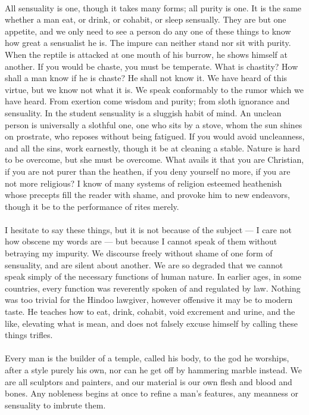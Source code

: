 \documentclass[letterpaper,12pt]{article}
\begin{document}
\paragraph{} All sensuality is one, though it takes many forms; all purity is
one. It is the same whether a man eat, or drink, or cohabit, or sleep sensually.
They are but one appetite, and we only need to see a person do any one of these
things to know how great a sensualist he is. The impure can neither stand nor
sit with purity. When the reptile is attacked at one mouth of his burrow, he
shows himself at another. If you would be chaste, you must be temperate. What is
chastity? How shall a man know if he is chaste? He shall not know it. We have
heard of this virtue, but we know not what it is. We speak conformably to the
rumor which we have heard. From exertion come wisdom and purity; from sloth
ignorance and sensuality. In the student sensuality is a sluggish habit of mind.
An unclean person is universally a slothful one, one who sits by a stove, whom
the sun shines on prostrate, who reposes without being fatigued. If you would
avoid uncleanness, and all the sins, work earnestly, though it be at cleaning a
stable. Nature is hard to be overcome, but she must be overcome. What avails it
that you are Christian, if you are not purer than the heathen, if you deny
yourself no more, if you are not more religious? I know of many systems of
religion esteemed heathenish whose precepts fill the reader with shame, and
provoke him to new endeavors, though it be to the performance of rites merely.

\paragraph{} I hesitate to say these things, but it is not because of the
subject --- I care not how obscene my words are --- but because I cannot speak
of them without betraying my impurity. We discourse freely without shame of one
form of sensuality, and are silent about another. We are so degraded that we
cannot speak simply of the necessary functions of human nature. In earlier ages,
in some countries, every function was reverently spoken of and regulated by law.
Nothing was too trivial for the Hindoo lawgiver, however offensive it may be to
modern taste. He teaches how to eat, drink, cohabit, void excrement and urine,
and the like, elevating what is mean, and does not falsely excuse himself by
calling these things trifles.

\paragraph{} Every man is the builder of a temple, called his body, to the god
he worships, after a style purely his own, nor can he get off by hammering
marble instead. We are all sculptors and painters, and our material is our own
flesh and blood and bones. Any nobleness begins at once to refine a man's
features, any meanness or sensuality to imbrute them.
\end{document}
